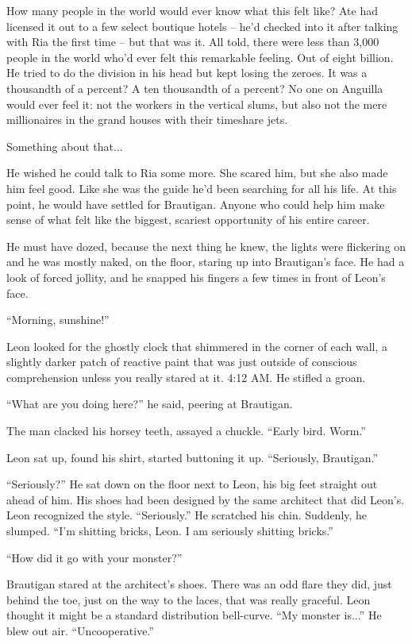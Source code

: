 How many people in the world would ever know what this felt like? Ate 
had licensed it out to a few select boutique hotels -- he'd checked 
into it after talking with Ria the first time -- but that was it. All 
told, there were less than 3,000 people in the world who'd ever felt 
this remarkable feeling. Out of eight billion. He tried to do the 
division in his head but kept losing the zeroes. It was a thousandth of 
a percent? A ten thousandth of a percent? No one on Anguilla would ever 
feel it: not the workers in the vertical slums, but also not the mere 
millionaires in the grand houses with their timeshare jets.

Something about that...

He wished he could talk to Ria some more. She scared him, but she also 
made him feel good. Like she was the guide he'd been searching for all 
his life. At this point, he would have settled for Brautigan. Anyone 
who could help him make sense of what felt like the biggest, scariest 
opportunity of his entire career.

He must have dozed, because the next thing he knew, the lights were 
flickering on and he was mostly naked, on the floor, staring up into 
Brautigan's face. He had a look of forced jollity, and he snapped his 
fingers a few times in front of Leon's face.

“Morning, sunshine!”

Leon looked for the ghostly clock that shimmered in the corner of each 
wall, a slightly darker patch of reactive paint that was just outside 
of conscious comprehension unless you really stared at it. 4:12 AM. He 
stifled a groan.

“What are you doing here?” he said, peering at Brautigan.

The man clacked his horsey teeth, assayed a chuckle. “Early bird. 
Worm.”

Leon sat up, found his shirt, started buttoning it up. “Seriously, 
Brautigan.”

“Seriously?” He sat down on the floor next to Leon, his big feet 
straight out ahead of him. His shoes had been designed by the same 
architect that did Leon's. Leon recognized the style. “Seriously.” 
He scratched his chin. Suddenly, he slumped. “I'm shitting bricks, 
Leon. I am seriously shitting bricks.”

“How did it go with your monster?”

Brautigan stared at the architect's shoes. There was an odd flare they 
did, just behind the toe, just on the way to the laces, that was really 
graceful. Leon thought it might be a standard distribution bell-curve. 
“My monster is...” He blew out air. “Uncooperative.”

